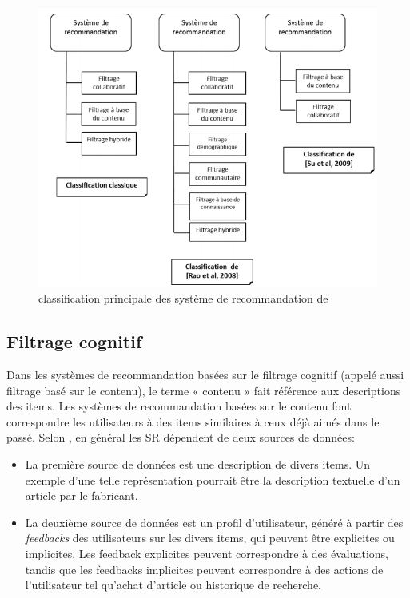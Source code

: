 \documentclass[a4paper,12pt,letterpaper,headsepline,singlespacing,headsepline, french]{report}
\begin{document}
\begin{figure}[H]
	\centering
	\includegraphics[width=\textwidth]{classification.PNG}
	\caption{classification principale des système de recommandation de \cite{ref5}}
	\label{fig:clas}
\end{figure}


\subsection{Filtrage cognitif }
Dans les systèmes de recommandation basées sur le filtrage cognitif (appelé aussi filtrage basé sur le contenu), le terme « contenu » fait référence aux descriptions des items. 
Les systèmes de recommandation basées sur le contenu font correspondre les utilisateurs à des items similaires à ceux déjà aimés dans le passé.
Selon \cite{ref3}, en général les SR dépendent de deux sources de données:
\begin{itemize}
\item  La première source de données est une description de divers items. Un exemple d'une telle représentation pourrait être la description textuelle d'un article par le fabricant.
\item La deuxième source de données est un profil d'utilisateur, généré à partir des \textit{feedbacks} des utilisateurs sur les divers items, qui peuvent être explicites ou implicites. 
Les feedback explicites peuvent correspondre à des évaluations, tandis que les feedbacks implicites peuvent correspondre à des actions de l'utilisateur tel qu’achat d’article ou historique de recherche.
\end{itemize}
\end{document}
